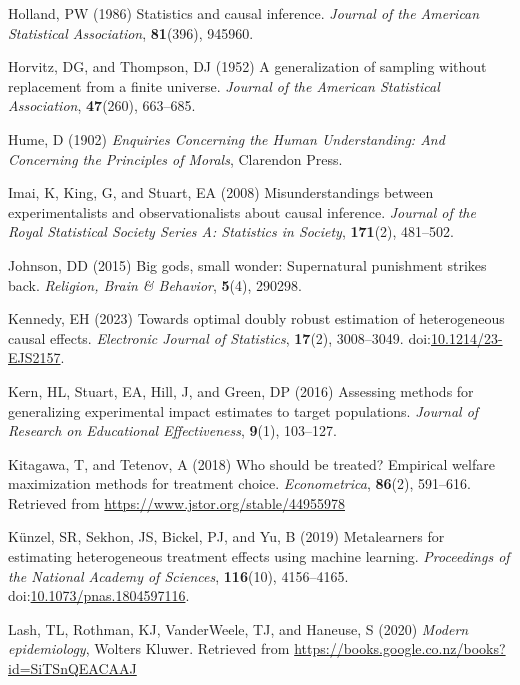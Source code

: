 \documentclass[
  singlecolumn]{article}
\newlength{\cslhangindent}
\newenvironment{CSLReferences}[2] %
 {\begin{list}{}{%
  \setlength{\itemindent}{0pt}
  \setlength{\leftmargin}{0pt}
  \setlength{\parsep}{0pt}
  \ifodd #1
   \setlength{\leftmargin}{\cslhangindent}
   \setlength{\itemindent}{-1\cslhangindent}
  \fi
  \setlength{\itemsep}{#2\baselineskip}}}
 {\end{list}}
\begin{document}
\begin{CSLReferences}{1}{0}
Holland, PW (1986) Statistics and causal inference. \emph{Journal of the
American Statistical Association}, \textbf{81}(396), 945960.

Horvitz, DG, and Thompson, DJ (1952) A generalization of sampling
without replacement from a finite universe. \emph{Journal of the
American Statistical Association}, \textbf{47}(260), 663--685.

Hume, D (1902) \emph{Enquiries Concerning the Human Understanding: And
Concerning the Principles of Morals}, Clarendon Press.

Imai, K, King, G, and Stuart, EA (2008) Misunderstandings between
experimentalists and observationalists about causal inference.
\emph{Journal of the Royal Statistical Society Series A: Statistics in
Society}, \textbf{171}(2), 481--502.

Johnson, DD (2015) Big gods, small wonder: Supernatural punishment
strikes back. \emph{Religion, Brain \& Behavior}, \textbf{5}(4), 290298.

Kennedy, EH (2023) Towards optimal doubly robust estimation of
heterogeneous causal effects. \emph{Electronic Journal of Statistics},
\textbf{17}(2), 3008--3049.
doi:\href{https://doi.org/10.1214/23-EJS2157}{10.1214/23-EJS2157}.

Kern, HL, Stuart, EA, Hill, J, and Green, DP (2016) Assessing methods
for generalizing experimental impact estimates to target populations.
\emph{Journal of Research on Educational Effectiveness}, \textbf{9}(1),
103--127.

Kitagawa, T, and Tetenov, A (2018) Who should be treated? Empirical
welfare maximization methods for treatment choice. \emph{Econometrica},
\textbf{86}(2), 591--616. Retrieved from
\url{https://www.jstor.org/stable/44955978}

Künzel, SR, Sekhon, JS, Bickel, PJ, and Yu, B (2019) Metalearners for
estimating heterogeneous treatment effects using machine learning.
\emph{Proceedings of the National Academy of Sciences},
\textbf{116}(10), 4156--4165.
doi:\href{https://doi.org/10.1073/pnas.1804597116}{10.1073/pnas.1804597116}.

Lash, TL, Rothman, KJ, VanderWeele, TJ, and Haneuse, S (2020)
\emph{Modern epidemiology}, Wolters Kluwer. Retrieved from
\url{https://books.google.co.nz/books?id=SiTSnQEACAAJ}


\end{CSLReferences}
\end{document}

